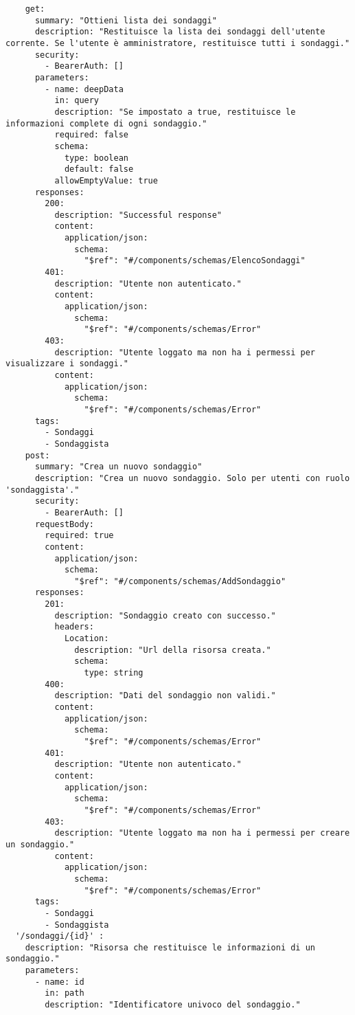 \begin{verbatim}
    get: 
      summary: "Ottieni lista dei sondaggi"
      description: "Restituisce la lista dei sondaggi dell'utente corrente. Se l'utente è amministratore, restituisce tutti i sondaggi."
      security:
        - BearerAuth: []
      parameters:
        - name: deepData
          in: query
          description: "Se impostato a true, restituisce le informazioni complete di ogni sondaggio."
          required: false
          schema:
            type: boolean
            default: false
          allowEmptyValue: true
      responses:
        200:
          description: "Successful response"
          content:
            application/json:
              schema:
                "$ref": "#/components/schemas/ElencoSondaggi"
        401:
          description: "Utente non autenticato."
          content:
            application/json:
              schema:
                "$ref": "#/components/schemas/Error"
        403:
          description: "Utente loggato ma non ha i permessi per visualizzare i sondaggi."
          content:
            application/json:
              schema:
                "$ref": "#/components/schemas/Error"
      tags:
        - Sondaggi
        - Sondaggista
    post: 
      summary: "Crea un nuovo sondaggio"
      description: "Crea un nuovo sondaggio. Solo per utenti con ruolo 'sondaggista'."
      security:
        - BearerAuth: []
      requestBody:
        required: true
        content:
          application/json:
            schema:
              "$ref": "#/components/schemas/AddSondaggio"
      responses:
        201:
          description: "Sondaggio creato con successo."
          headers:
            Location:
              description: "Url della risorsa creata."
              schema:
                type: string
        400:
          description: "Dati del sondaggio non validi."
          content:
            application/json:
              schema:
                "$ref": "#/components/schemas/Error"
        401:
          description: "Utente non autenticato."
          content:
            application/json:
              schema:
                "$ref": "#/components/schemas/Error"
        403:
          description: "Utente loggato ma non ha i permessi per creare un sondaggio."
          content:
            application/json:
              schema:
                "$ref": "#/components/schemas/Error"
      tags:
        - Sondaggi
        - Sondaggista
  '/sondaggi/{id}' :
    description: "Risorsa che restituisce le informazioni di un sondaggio."
    parameters:
      - name: id
        in: path
        description: "Identificatore univoco del sondaggio."

\end{verbatim}
